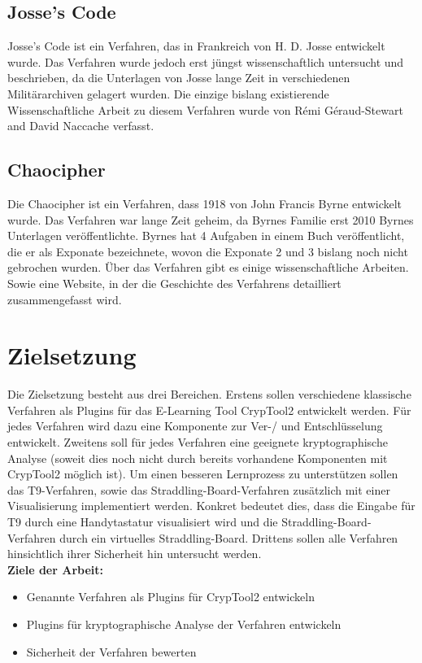 \documentclass[fontsize=11pt, paper=a4, parskip=half]{scrartcl}
\begin{document}
\subsection{Josse's Code}
Josse's Code ist ein Verfahren, das in Frankreich von H. D. Josse entwickelt wurde. Das Verfahren wurde jedoch erst jüngst wissenschaftlich untersucht und beschrieben, da die Unterlagen von Josse lange Zeit in verschiedenen Militärarchiven gelagert wurden. Die einzige bislang existierende Wissenschaftliche Arbeit zu diesem Verfahren wurde von Rémi Géraud-Stewart and David Naccache verfasst. \cite{GeraudStewart2020AFrenchCipherFromTheLate19thCentury}
\subsection{Chaocipher}
Die Chaocipher ist ein Verfahren, dass 1918 von John Francis Byrne entwickelt wurde. Das Verfahren war lange Zeit geheim, da Byrnes Familie erst 2010 Byrnes Unterlagen veröffentlichte. Byrnes hat 4 Aufgaben in einem Buch veröffentlicht, die er als Exponate bezeichnete, wovon die Exponate 2 und 3 bislang noch nicht gebrochen wurden.\cite{Cowan2010CHAOCIPHERSOLVINGEXHIBITS1and4} \cite{scheffler2010Chaocipher} Über das Verfahren gibt es einige wissenschaftliche Arbeiten. \cite{Rubin2011JohnFByrnesChaocipherRevealed} \cite{Hill2009CHAOCIPHERANALYSISANDMODELS}
 \cite{Rubin2010CHAOCIPHERREVEALEDTHEALGORITHM}
Sowie eine Website, in der die Geschichte des Verfahrens detailliert zusammengefasst wird.
 \cite{Rubin2020TheChaocipherClearingHouse}   
\section{Zielsetzung}
Die Zielsetzung besteht aus drei Bereichen. Erstens sollen verschiedene klassische Verfahren als Plugins für das E-Learning Tool CrypTool2 entwickelt werden. Für jedes Verfahren wird dazu eine Komponente zur Ver-/ und Entschlüsselung entwickelt. Zweitens soll für jedes Verfahren eine geeignete kryptographische Analyse  (soweit dies noch nicht durch bereits vorhandene Komponenten mit CrypTool2 möglich ist). Um einen besseren Lernprozess zu unterstützen sollen das T9-Verfahren, sowie das Straddling-Board-Verfahren zusätzlich mit einer Visualisierung implementiert werden. Konkret bedeutet dies, dass die Eingabe für T9 durch eine Handytastatur visualisiert wird und die Straddling-Board-Verfahren durch ein virtuelles Straddling-Board. Drittens sollen alle Verfahren hinsichtlich ihrer Sicherheit hin untersucht werden.\\
\linebreak
\textbf{Ziele der Arbeit:}
\begin{itemize}
	\item{Genannte Verfahren als Plugins für CrypTool2 entwickeln}
	\item{Plugins für kryptographische Analyse der Verfahren entwickeln}
	\item{Sicherheit der Verfahren bewerten}	
\end{itemize}
\end{document}
